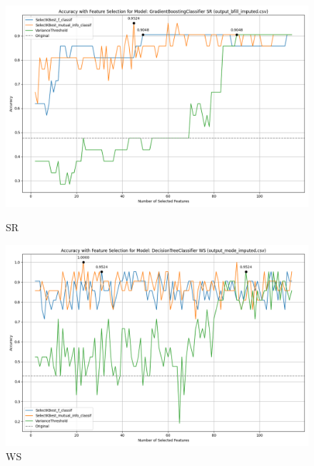 \begin{figure}[H]
    \centering
    \begin{minipage}[b]{0.45\textwidth}
        \includegraphics[width=\textwidth]{class_all_section/images_class_ensemble_reduction/feature_selection_accuracy_plot_output_bfill_imputedcsv_GradientBoostingClassifier_SR.png}
        \caption{SR}
        \label{fig_class_all:sr_featred_graph}
    \end{minipage}
    \hfill
    \begin{minipage}[b]{0.45\textwidth}
        \includegraphics[width=\textwidth]{class_all_section/images_class_ensemble_reduction/feature_selection_accuracy_plot_output_mode_imputedcsv_DecisionTreeClassifier_WS.png}
        \caption{WS}
        \label{fig_class_all:ws_featred_graph}
    \end{minipage}
\end{figure}


